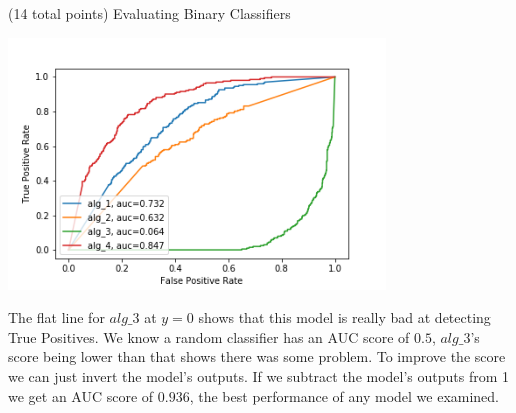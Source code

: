 \documentclass[12pt]{article}
\begin{document}
\begin{question}{(14 total points) Evaluating Binary Classifiers}
\begin{subquestion}
\begin{answerbox}{35em}
\begin{center}
    \includegraphics[width=0.75\textwidth]{results/roc-curves.png}
\end{center}    
The flat line for $alg\_3$ at $y=0$ shows that this model is really bad at detecting True Positives. We know a random classifier has an AUC score of $0.5$, $alg\_3$'s score being lower than that shows there was some problem. To improve  the score we can just invert the model's outputs. If we subtract the model's outputs from 1 we get an AUC score of $0.936$, the best performance of any model we examined.
\end{answerbox}



\end{subquestion}

\end{question}
\end{document}
